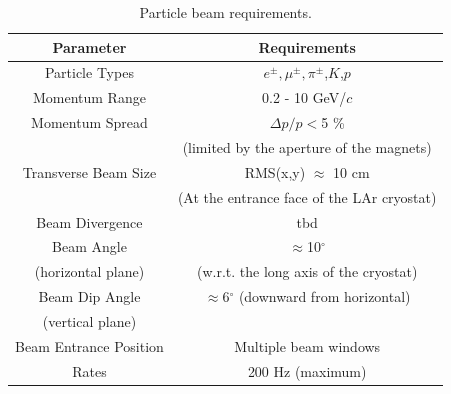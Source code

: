 
%

\begin{table}[h]
\centering
\begin{tabular}{|c|c|}
\hline
\textbf{Parameter } & \textbf{Requirements}  \\ \hline
  Particle Types        & $e^\pm,\mu^\pm,\pi^\pm$,$K$,$p$  \\ \hline
  Momentum Range   & 0.2 - 10 GeV/$c$ \\ \hline
  Momentum Spread   & $\Delta p/p  < $5 \% \\
  & (limited by the aperture of the magnets)  \\ \hline
  Transverse Beam Size   & RMS(x,y) $\approx$ 10 cm  \\
  & (At the entrance face of the LAr cryostat) \\ \hline
  Beam Divergence & tbd   \\ \hline
  Beam Angle &  $\approx$10$^{\circ}$ \\
  (horizontal plane) &  (w.r.t. the long axis of the cryostat)\\ \hline
  Beam Dip Angle &  $\approx$6$^\circ$ (downward from horizontal)   \\ 
  (vertical plane) &  \\ \hline
  Beam Entrance Position & Multiple beam windows    \\ \hline
  Rates & 200 Hz (maximum)    \\ \hline
\end{tabular}
\caption{Particle beam requirements.}
\label{table:beamspecs}
\end{table}

